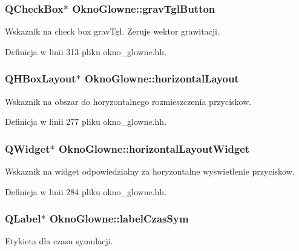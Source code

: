 \subsubsection[{grav\+Tgl\+Button}]{\setlength{\rightskip}{0pt plus 5cm}Q\+Check\+Box$\ast$ Okno\+Glowne\+::grav\+Tgl\+Button\hspace{0.3cm}{\ttfamily [private]}}\label{class_okno_glowne_ae6e8681e77286aae1f4025ee5ba1ad69}
Wskaznik na check box grav\+Tgl. Zeruje wektor grawitacji. 

Definicja w linii 313 pliku okno\+\_\+glowne.\+hh.

\hypertarget{class_okno_glowne_aacb5ddb6d0eb560a47917cc1b457239a}{}
\subsubsection[{horizontal\+Layout}]{\setlength{\rightskip}{0pt plus 5cm}Q\+H\+Box\+Layout$\ast$ Okno\+Glowne\+::horizontal\+Layout\hspace{0.3cm}{\ttfamily [private]}}\label{class_okno_glowne_aacb5ddb6d0eb560a47917cc1b457239a}
Wskaznik na obszar do horyzontalnego rozmieszczenia przyciskow. 

Definicja w linii 277 pliku okno\+\_\+glowne.\+hh.

\hypertarget{class_okno_glowne_a12ac2d00b9ca186176ccc710a928a723}{}
\subsubsection[{horizontal\+Layout\+Widget}]{\setlength{\rightskip}{0pt plus 5cm}Q\+Widget$\ast$ Okno\+Glowne\+::horizontal\+Layout\+Widget\hspace{0.3cm}{\ttfamily [private]}}\label{class_okno_glowne_a12ac2d00b9ca186176ccc710a928a723}
Wskaznik na widget odpowiedzialny za horyzontalne wyswietlenie przyciskow. 

Definicja w linii 284 pliku okno\+\_\+glowne.\+hh.

\hypertarget{class_okno_glowne_aca07e1dc5cbe30d6952f9b952073bb79}{}
\subsubsection[{label\+Czas\+Sym}]{\setlength{\rightskip}{0pt plus 5cm}Q\+Label$\ast$ Okno\+Glowne\+::label\+Czas\+Sym\hspace{0.3cm}{\ttfamily [private]}}\label{class_okno_glowne_aca07e1dc5cbe30d6952f9b952073bb79}
Etykieta dla czasu symulacji. 

